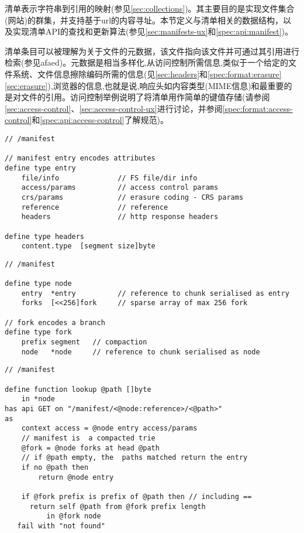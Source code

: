 清单表示字符串到引用的映射(参见\ref{sec:collections})。其主要目的是实现文件集合(网站)的群集，并支持基于url的内容寻址。本节定义与清单相关的数据结构，以及实现清单API的查找和更新算法(参见\ref{sec:manifests-ux}和\ref{spec:api:manifest})。

清单条目可以被理解为关于文件的元数据，该文件指向该文件并可通过其引用进行检索(参见afaed)。元数据是相当多样化,从访问控制所需信息,类似于一个给定的文件系统、文件信息擦除编码所需的信息(见\ref{sec:headers}和\ref{spec:format:erasure} \ref{sec:erasure}),浏览器的信息,也就是说,响应头如内容类型(MIME信息)和最重要的是对文件的引用。访问控制举例说明了将清单用作简单的键值存储(请参阅\ref{sec:access-control}、\ref{sec:access-control-ux}进行讨论，并参阅\ref{spec:format:access-control}和\ref{spec:api:access-control}了解规范)。

\begin{definition}\label{def:manifest-entry}
\begin{lstlisting}[language=buzz1]
// /manifest

// manifest entry encodes attributes 
define type entry 
    file/info              // FS file/dir info
    access/params          // access control params
    crs/params             // erasure coding - CRS params
    reference              // reference
    headers                // http response headers 

define type headers
    content.type  [segment size]byte

\end{lstlisting}
\end{definition}

\begin{definition}\label{def:manifests}
\begin{lstlisting}[language=buzz1]
// /manifest

define type node 
    entry  *entry          // reference to chunk serialised as entry
    forks  [<<256]fork     // sparse array of max 256 fork

// fork encodes a branch
define type fork 
    prefix segment   // compaction 
    node   *node     // reference to chunk serialised as node

\end{lstlisting}
\end{definition}

\begin{definition}\label{def:manifests-lookup}
\begin{lstlisting}[language=buzz1]
// /manifest

define function lookup @path []byte
    in *node
has api GET on "/manifest/<@node:reference>/<@path>"
as 
    context access = @node entry access/params 
    // manifest is  a compacted trie
    @fork = @node forks at head @path 
    // if @path empty, the  paths matched return the entry
    if no @path then 
        return @node entry

    if @fork prefix is prefix of @path then // including == 
      return self @path from @fork prefix length
          in @fork node 
   fail with "not found"

\end{lstlisting}
\end{definition}


